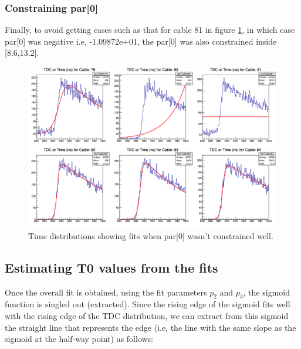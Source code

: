 \documentclass[12pt,epsfig]{article}
\begin{document}
\subsubsection{Constraining par[0]}
Finally, to avoid getting cases such as that for cable 81 in figure \ref{tdcNoSigm}, 
in which case par[0] was negative i.e, -1.09872e+01, the par[0] was also constrained inside [8.6,13.2].
\begin{figure}
    \centering
    \includegraphics[width=1.0\textwidth]{Figures/tdcForRun068_Cables79to84nw0.png}
    \caption{Time distributions showing fits when par[0] wasn't constrained well.}
    \label{tdcNoSigm}
\end{figure}




\subsection{Estimating T0 values from the fits}

Once the overall fit is obtained, using the fit parameters $p_2$ and $p_3$, the sigmoid
function is singled out (extracted). Since the rising edge of the sigmoid fits well with the rising
edge of the TDC distribution, we can extract from this sigmoid the straight line that
represents the edge (i.e, the line with the same slope as the sigmoid at the half-way
point) as follows:
\end{document}
